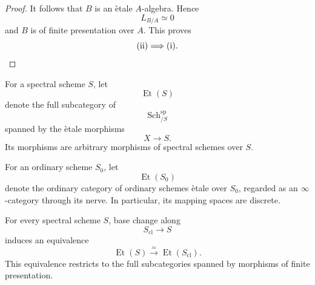 \begin{proof}
It follows that \(B\) is an \`etale \(A\)-algebra. Hence
\[
    L_{B/A}
    \simeq
    0
\]
and \(B\) is of finite presentation over \(A\). This proves
\[
    \textup{(ii)}
    \Longrightarrow
    \textup{(i)}.
\]
\end{proof}

\begin{definition}
\label{def:etale-category-over-spectral-scheme}
For a spectral scheme \(S\), let
\[
    \operatorname{Et}(S)
\]
denote the full subcategory of
\[
    \operatorname{Sch}^{\mathrm{sp}}_{/S}
\]
spanned by the \`etale morphisms
\[
    X
    \longrightarrow
    S.
\]
Its morphisms are arbitrary morphisms of spectral schemes over \(S\).

For an ordinary scheme \(S_0\), let
\[
    \operatorname{Et}(S_0)
\]
denote the ordinary category of ordinary schemes \`etale over \(S_0\),
regarded as an \(\infty\)-category through its nerve. In particular, its
mapping spaces are discrete.
\end{definition}

\begin{theorem}
\label{thm:etale-invariance-classical-truncation}
For every spectral scheme \(S\), base change along
\[
    S_{\mathrm{cl}}
    \longrightarrow
    S
\]
induces an equivalence
\[
    \operatorname{Et}(S)
    \xrightarrow{\simeq}
    \operatorname{Et}(S_{\mathrm{cl}}).
\]
This equivalence restricts to the full subcategories spanned by morphisms
of finite presentation.
\end{theorem}

